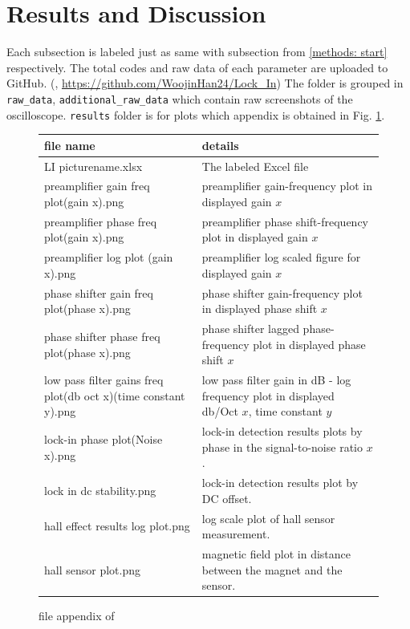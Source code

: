 \documentclass{article}
\begin{document}
\section{Results and Discussion}
\label{results: start}
 Each subsection is labeled just as same with subsection from \ref{methods: start} respectively.
 The total codes and raw data of each parameter are uploaded to GitHub.
 (\cite{github}, \url{https://github.com/WoojinHan24/Lock_In})
 The folder is grouped in \verb|raw_data|, \verb|additional_raw_data| which contain raw screenshots of the oscilloscope.
 \verb|results| folder is for plots which appendix is obtained in Fig. \ref{fig: file_appendix}.

\begin{figure}[H]
    \begin{tabular}{  m{6.2cm} | m{7.7cm} } 

      file name& details \\ 
      \hline
      \hline
        LI picturename.xlsx & The labeled Excel file\\
      \hline
        preamplifier gain freq plot(gain x).png & preamplifier gain-frequency plot in displayed gain $x$\\
      \hline
        preamplifier phase freq plot(gain x).png & preamplifier phase shift-frequency plot in displayed gain $x$\\
      \hline
        preamplifier log plot (gain x).png & preamplifier log scaled figure for displayed gain $x$\\
      \hline
        phase shifter gain freq plot(phase x).png & phase shifter gain-frequency plot in displayed phase shift $x$\\
      \hline
        phase shifter phase freq plot(phase x).png & phase shifter lagged phase-frequency plot in displayed phase shift $x$\\
      \hline
        low pass filter gains freq plot(db oct x)(time constant y).png & low pass filter gain in dB - log frequency plot in displayed db/Oct $x$, time constant $y$\\
      \hline
        lock-in phase plot(Noise x).png & lock-in detection results plots by phase in the signal-to-noise ratio $x$.\\
      \hline
        lock in dc stability.png & lock-in detection results plot by DC offset.\\
      \hline
        hall effect results log plot.png & log scale plot of hall sensor measurement.\\
      \hline
        hall sensor plot.png & magnetic field plot in distance between the magnet and the sensor.
    \end{tabular}
    \caption{file appendix of \cite{github}}
    \label{fig: file_appendix}
\end{figure}
\end{document}
